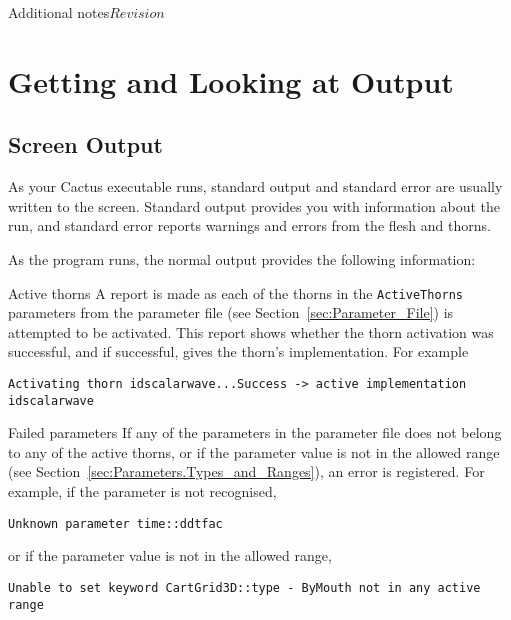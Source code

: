 \begin{cactuspart}{Additional notes}{}{$Revision$}


\chapter{Getting and Looking at Output}


\section{Screen Output}

As your Cactus executable runs, standard output and standard error
are usually written to the screen. Standard output provides you
with information about the run, and standard error reports warnings
and errors from the flesh and thorns.

As the program runs, the normal output provides the following information:

\begin{Lentry}

\item [Active thorns]
        A report is made as each of the thorns in the \texttt{ActiveThorns}
parameters from the parameter file (see Section~\ref{sec:Parameter_File})
is attempted to be activated. This report
shows whether the thorn activation was successful, and if successful, gives the
thorn's implementation. For example

\begin{verbatim}
Activating thorn idscalarwave...Success -> active implementation idscalarwave
\end{verbatim}

\item [Failed parameters]
         If any of the parameters in the parameter file does not belong to any
of the active thorns, or if the parameter value is not in the allowed range
(see Section~\ref{sec:Parameters.Types_and_Ranges}),
an error is registered. For example, if the parameter is not recognised,

\begin{verbatim}
Unknown parameter time::ddtfac
\end{verbatim}
or if the parameter value is not in the allowed range,

\begin{verbatim}
Unable to set keyword CartGrid3D::type - ByMouth not in any active range
\end{verbatim}


\end{Lentry}
\end{cactuspart}
